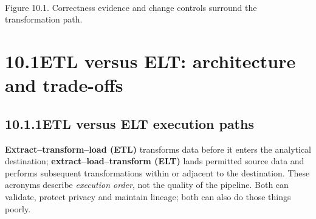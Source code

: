 \documentclass[11pt,twoside]{article}
\newcommand{\topic}[2]{\subsection*{#1\quad #2}}
\begin{document}
\begin{center}\\{\fontsize{8}{9}\selectfont\color{inkgray}Figure 10.1. Correctness evidence and change controls surround the transformation path.}\end{center}
\newpage
\section*{10.1\quad ETL versus ELT: architecture and trade-offs}
\topic{10.1.1}{ETL versus ELT execution paths}
\textbf{Extract--transform--load (ETL)} transforms data before it enters the analytical destination; \textbf{extract--load--transform (ELT)} lands permitted source data and performs subsequent transformations within or adjacent to the destination. These acronyms describe \emph{execution order}, not the quality of the pipeline. Both can validate, protect privacy and maintain lineage; both can also do those things poorly.
\end{document}
